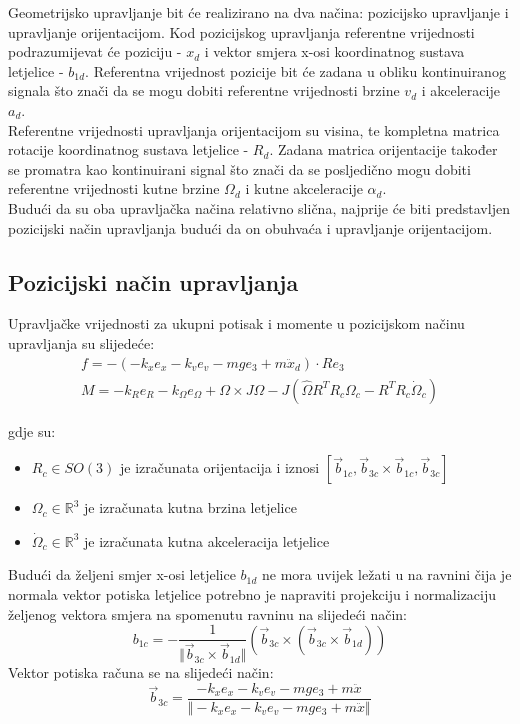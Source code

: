 \documentclass[times, utf8, diplomski, numeric]{fer}
\begin{document}
	Geometrijsko upravljanje bit će realizirano na dva načina: pozicijsko upravljanje i upravljanje orijentacijom. Kod pozicijskog upravljanja referentne vrijednosti podrazumijevat će poziciju - $x_d$ i vektor smjera x-osi koordinatnog sustava letjelice - $b_{1d}$. Referentna vrijednost pozicije bit će zadana u obliku kontinuiranog signala što znači da se mogu dobiti referentne vrijednosti brzine $v_d$ i akceleracije $a_d$. \\
	Referentne vrijednosti upravljanja orijentacijom su visina, te kompletna matrica rotacije koordinatnog sustava letjelice - $R_d$. Zadana matrica orijentacije također se promatra kao kontinuirani signal što znači da se posljedično mogu dobiti referentne vrijednosti kutne brzine $\Omega_d$ i kutne akceleracije $\alpha_d$. \\
	Budući da su oba upravljačka načina relativno slična, najprije će biti predstavljen pozicijski način upravljanja budući da on obuhvaća i upravljanje orijentacijom.  \\
	\subsection{Pozicijski način upravljanja}
	Upravljačke vrijednosti za ukupni potisak i momente u pozicijskom načinu upravljanja su slijedeće:
	\begin{gather}
		f = - (- k_x e_x - k_v e_v - mg e_3 + m \ddot{x}_d) \cdot Re_3 \label{thrust_ctrl} \\
		M = -k_R e_R - k_\Omega e_\Omega + \Omega \times J \Omega - J(\hat{\Omega}R^TR_c\Omega_c - R^TR_c\dot{\Omega}_c) \label{pos_moment}
	\end{gather}
	
	gdje su:
	\begin{itemize}
		\item $R_c \in SO(3)$ je izračunata orijentacija i iznosi $[\vec{b}_{1c}, \vec{b}_{3c} \times \vec{b}_{1c}, \vec{b}_{3c}]$ 
		\item $\Omega_c \in \mathbb{R}^3$ je izračunata kutna brzina letjelice 
		\item $\dot{\Omega}_c \in \mathbb{R}^3$ je izračunata kutna akceleracija letjelice
	\end{itemize}
	Budući da željeni smjer x-osi letjelice $b_{1d}$ ne mora uvijek ležati u na ravnini čija je normala vektor potiska letjelice potrebno je napraviti projekciju i normalizaciju željenog vektora smjera na spomenutu ravninu na slijedeći način:
	\begin{equation}
		b_{1c} = - \frac{1}{\Vert \vec{b}_{3c} \times \vec{b}_{1d} \Vert}(\vec{b}_{3c} \times (\vec{b}_{3c} \times \vec{b}_{1d}))
	\end{equation}
	Vektor potiska računa se na slijedeći način:
	\begin{equation}
		\vec{b}_{3c} = \frac{- k_x e_x - k_v e_v - mg e_3 + m \ddot{x}}{\Vert - k_x e_x - k_v e_v - mg e_3 + m \ddot{x} \Vert}
	\end{equation}
	
\end{document}
